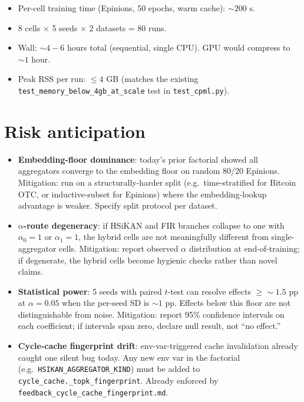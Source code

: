 \documentclass[11pt]{article}
\begin{document}
\begin{itemize}
  \item Per-cell training time (Epinions, 50 epochs, warm cache):
    $\sim 200$ s.
  \item 8 cells $\times$ 5 seeds $\times$ 2 datasets = 80 runs.
  \item Wall: $\sim 4-6$ hours total (sequential, single CPU).
    GPU would compress to $\sim 1$ hour.
  \item Peak RSS per run: $\le 4$ GB (matches the existing
    \texttt{test\_memory\_below\_4gb\_at\_scale} test in
    \texttt{test\_cpml.py}).
\end{itemize}

\section{Risk anticipation}

\begin{itemize}
  \item \textbf{Embedding-floor dominance}: today's prior factorial
    showed all aggregators converge to the embedding floor on
    random 80/20 Epinions. Mitigation: run on a structurally-harder
    split (e.g.\ time-stratified for Bitcoin OTC, or
    inductive-subset for Epinions) where the embedding-lookup
    advantage is weaker. Specify split protocol per dataset.
  \item \textbf{$\alpha$-route degeneracy}: if HSiKAN and FIR
    branches collapse to one with $\alpha_0 = 1$ or $\alpha_1 = 1$,
    the hybrid cells are not meaningfully different from
    single-aggregator cells. Mitigation: report observed $\alpha$
    distribution at end-of-training; if degenerate, the hybrid
    cells become hygienic checks rather than novel claims.
  \item \textbf{Statistical power}: 5 seeds with paired $t$-test
    can resolve effects $\ge \sim 1.5$ pp at $\alpha=0.05$ when the
    per-seed SD is $\sim 1$ pp. Effects below this floor are not
    distinguishable from noise. Mitigation: report 95\% confidence
    intervals on each coefficient; if intervals span zero, declare
    null result, not ``no effect.''
  \item \textbf{Cycle-cache fingerprint drift}: env-var-triggered
    cache invalidation already caught one silent bug today. Any
    new env var in the factorial (e.g.\ \texttt{HSIKAN\_AGGREGATOR\_KIND})
    must be added to \texttt{cycle\_cache.\_topk\_fingerprint}.
    Already enforced by \texttt{feedback\_cycle\_cache\_fingerprint.md}.
\end{itemize}
\end{document}
